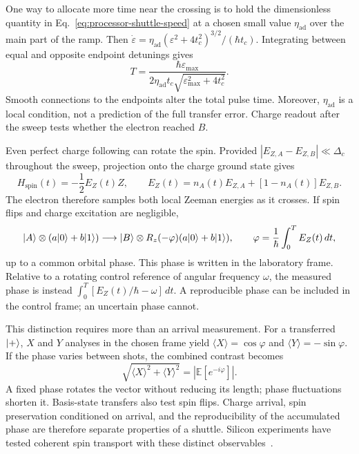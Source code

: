 One way to allocate more time near the crossing is to hold the
dimensionless quantity in Eq.~\eqref{eq:processor-shuttle-speed}
at a chosen small value \(\eta_{\mathrm{ad}}\) over the main
part of the ramp. Then
\(\dot\varepsilon=
\eta_{\mathrm{ad}}(\varepsilon^2+4t_c^2)^{3/2}/(\hbar t_c)\).
Integrating between equal and opposite endpoint detunings gives
\begin{equation}
 T=\frac{\hbar\varepsilon_{\max}}
 {2\eta_{\mathrm{ad}}t_c
                 \sqrt{\varepsilon_{\max}^2+4t_c^2}}.
 \label{eq:processor-local-adiabatic-time}
\end{equation}
Smooth connections to the endpoints alter the total pulse time.
Moreover, \(\eta_{\mathrm{ad}}\) is a local condition, not a
prediction of the full transfer error. Charge readout after the
sweep tests whether the electron reached \(B\).

Even perfect charge following can rotate the spin. Provided
\(|E_{Z,A}-E_{Z,B}|\ll\Delta_c\) throughout the sweep, projection
onto the charge ground state gives
\[
 H_{\mathrm{spin}}(t)=-\frac12E_Z(t)Z,\qquad
 E_Z(t)=n_A(t)E_{Z,A}+[1-n_A(t)]E_{Z,B}.
\]
The electron therefore samples both local Zeeman energies as
it crosses. If spin flips and charge excitation are negligible,
\begin{equation}
 \ket A\otimes(a\ket0+b\ket1)
 \longrightarrow
 \ket B\otimes R_z(-\varphi)(a\ket0+b\ket1),
 \qquad
 \varphi=\frac1\hbar\int_0^T E_Z(t)\,dt,
 \label{eq:processor-shuttle-phase}
\end{equation}
up to a common orbital phase. This phase is written in the
laboratory frame. Relative to a rotating control reference of
angular frequency \(\omega\), the measured phase is instead
\(\int_0^T[E_Z(t)/\hbar-\omega]\,dt\). A reproducible phase can
be included in the control frame; an uncertain phase cannot.

This distinction requires more than an arrival measurement.
For a transferred \(\lvert +\rangle\), \(X\) and \(Y\) analyses in the
chosen frame yield \(\langle X\rangle=\cos\varphi\) and
\(\langle Y\rangle=-\sin\varphi\). If the phase varies between
shots, the combined contrast becomes
\[
 \sqrt{\langle X\rangle^2+\langle Y\rangle^2}
       =|\mathbb E[e^{-i\varphi}]|.
\]
A fixed phase rotates the vector without reducing its length;
phase fluctuations shorten it. Basis-state transfers also test
spin flips. Charge arrival, spin preservation conditioned on
arrival, and the reproducibility of the accumulated phase are
therefore separate properties of a shuttle. Silicon experiments
have tested coherent spin transport with these distinct
observables~\cite{Yoneda2021Transport}.

